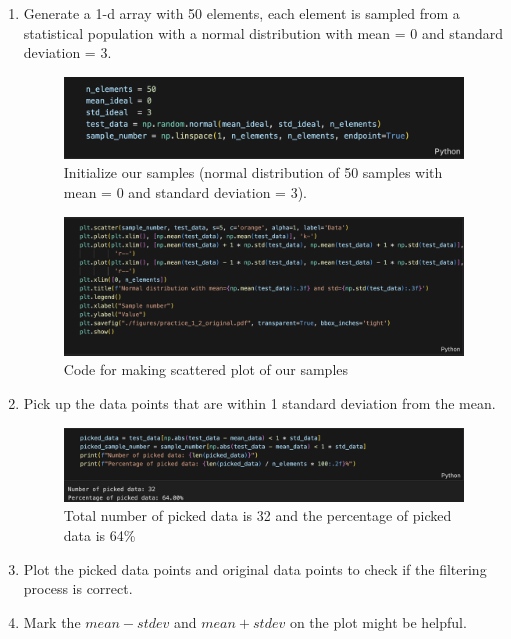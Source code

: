 \documentclass[12pt,a4paper]{article}
\begin{document}
\begin{CJK}{UTF8}{bkai}
\begin{enumerate}
    \item Generate a 1-d array with 50 elements, each element is sampled from a statistical population with a normal distribution with mean = 0 and standard deviation = 3.
    \begin{figure}[h]
        \centering
        \includegraphics[width=0.9\linewidth]{figures/code/code_2_2.png}
        \caption{Initialize our samples (normal distribution of 50 samples with mean = 0 and standard deviation = 3).}
        \label{fig:code_2_2}
    \end{figure}
    \clearpage
    \begin{figure}[h]
        \centering
        \includegraphics[width=0.9\linewidth]{figures/code/code_2_4.png}
        \caption{Code for making scattered plot of our samples}
        \label{fig:code_2_4}
    \end{figure}
    \item Pick up the data points that are within 1 standard deviation from the mean.
    \begin{figure}[h]
        \centering
        \includegraphics[width=0.9\linewidth]{figures/code/code_2_5.png}
        \caption{Total number of picked data is 32 and the percentage of picked data is 64\%}
        \label{fig:code_2_5}
    \end{figure}
    \item Plot the picked data points and original data points to check if the filtering process is correct.
    \item Mark the $mean-stdev$ and $mean+stdev$ on the plot might be helpful.

\end{enumerate}
\end{CJK}
\end{document}
